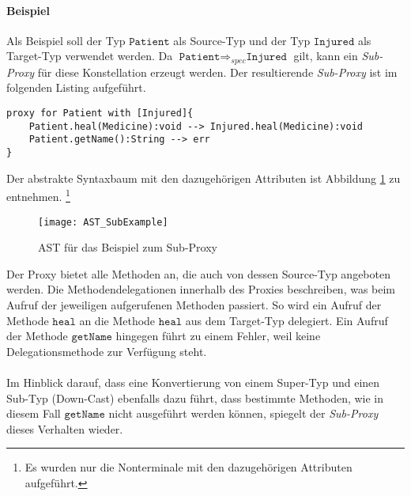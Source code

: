 \paragraph{Beispiel}
Als Beispiel soll  der Typ $\texttt{Patient}$ als Source-Typ und der Typ $\texttt{Injured}$ als Target-Typ verwendet werden. Da $\texttt{Patient} \Rightarrow_{spec} \texttt{Injured}$ gilt, kann ein \emph{Sub-Proxy} für diese Konstellation erzeugt werden. Der resultierende \emph{Sub-Proxy} ist im folgenden Listing aufgeführt.
\begin{lstlisting}[style = dsl, caption = Sub-Proxy für Patient, captionpos = b]
proxy for Patient with [Injured]{
	Patient.heal(Medicine):void --> Injured.heal(Medicine):void
	Patient.getName():String --> err
}
\end{lstlisting}
Der abstrakte Syntaxbaum mit den dazugehörigen Attributen ist Abbildung \ref{fig:ASTSUB} zu entnehmen. \footnote{Es wurden nur die Nonterminale mit den dazugehörigen Attributen aufgeführt.}
\begin{figure}[h!]
\texttt{[image: AST\_SubExample]}
\caption{AST für das Beispiel zum Sub-Proxy}
\label{fig:ASTSUB}
\end{figure}
\noindent
Der Proxy bietet alle Methoden an, die auch von dessen Source-Typ angeboten werden. Die Methodendelegationen innerhalb des Proxies beschreiben, was beim Aufruf der jeweiligen aufgerufenen Methoden passiert. So wird ein Aufruf der Methode $\texttt{heal}$ an die Methode $\texttt{heal}$ aus dem Target-Typ delegiert. Ein Aufruf der Methode $\texttt{getName}$ hingegen führt zu einem Fehler, weil keine Delegationsmethode zur Verfügung steht.
\\\\
Im Hinblick darauf, dass eine Konvertierung von einem Super-Typ und einen Sub-Typ (Down-Cast) ebenfalls dazu führt, dass bestimmte Methoden, wie in diesem Fall $\texttt{getName}$ nicht ausgeführt werden können, spiegelt der \emph{Sub-Proxy} dieses Verhalten wieder.
